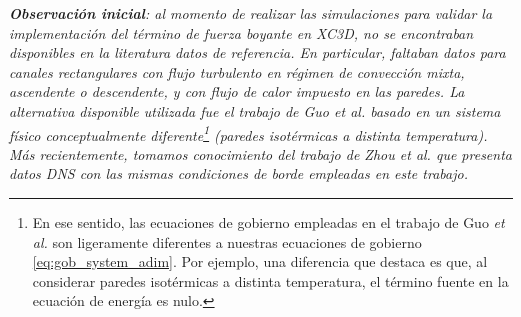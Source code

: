 \textit{\textbf{Observación inicial}: al momento de realizar las simulaciones para validar la implementación del término de fuerza boyante en XC3D, no se encontraban disponibles en la literatura datos de referencia. En particular, faltaban datos para canales rectangulares con flujo turbulento en régimen de convección mixta, ascendente o descendente, y con flujo de calor impuesto en las paredes. La alternativa disponible utilizada fue el trabajo de Guo \textit{et al.} \cite{guo2022direct} basado en un sistema físico conceptualmente diferente\footnote{En ese sentido, las ecuaciones de gobierno empleadas en el trabajo de Guo \textit{et al.} son ligeramente diferentes a nuestras ecuaciones de gobierno \ref{eq:gob_system_adim}. Por ejemplo, una diferencia que destaca es que, al considerar paredes isotérmicas a distinta temperatura, el término fuente en la ecuación de energía es nulo.} (paredes isotérmicas a distinta temperatura). Más recientemente, tomamos conocimiento del trabajo de Zhou \textit{et al.} \cite{zhou2024direct} que presenta datos DNS con las mismas condiciones de borde empleadas en este trabajo.}


